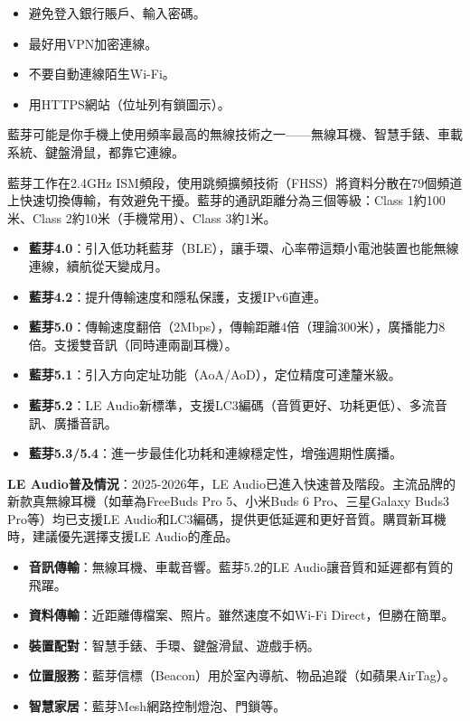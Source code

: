 \begin{itemize}
  \item 避免登入銀行賬戶、輸入密碼。
  \item 最好用VPN加密連線。
  \item 不要自動連線陌生Wi-Fi。
  \item 用HTTPS網站（位址列有鎖圖示）。
\end{itemize}


藍芽可能是你手機上使用頻率最高的無線技術之一——無線耳機、智慧手錶、車載系統、鍵盤滑鼠，都靠它連線。


藍芽工作在2.4GHz ISM頻段，使用跳頻擴頻技術（FHSS）將資料分散在79個頻道上快速切換傳輸，有效避免干擾。藍芽的通訊距離分為三個等級：Class 1約100米、Class 2約10米（手機常用）、Class 3約1米。


\begin{itemize}
  \item \textbf{藍芽4.0}：引入低功耗藍芽（BLE），讓手環、心率帶這類小電池裝置也能無線連線，續航從天變成月。
  \item \textbf{藍芽4.2}：提升傳輸速度和隱私保護，支援IPv6直連。
  \item \textbf{藍芽5.0}：傳輸速度翻倍（2Mbps），傳輸距離4倍（理論300米），廣播能力8倍。支援雙音訊（同時連兩副耳機）。
  \item \textbf{藍芽5.1}：引入方向定址功能（AoA/AoD），定位精度可達釐米級。
  \item \textbf{藍芽5.2}：LE Audio新標準，支援LC3編碼（音質更好、功耗更低）、多流音訊、廣播音訊。
  \item \textbf{藍芽5.3/5.4}：進一步最佳化功耗和連線穩定性，增強週期性廣播。
\end{itemize}

\textbf{LE Audio普及情況}：2025-2026年，LE Audio已進入快速普及階段。主流品牌的新款真無線耳機（如華為FreeBuds Pro 5、小米Buds 6 Pro、三星Galaxy Buds3 Pro等）均已支援LE Audio和LC3編碼，提供更低延遲和更好音質。購買新耳機時，建議優先選擇支援LE Audio的產品。


\begin{itemize}
  \item \textbf{音訊傳輸}：無線耳機、車載音響。藍芽5.2的LE Audio讓音質和延遲都有質的飛躍。
  \item \textbf{資料傳輸}：近距離傳檔案、照片。雖然速度不如Wi-Fi Direct，但勝在簡單。
  \item \textbf{裝置配對}：智慧手錶、手環、鍵盤滑鼠、遊戲手柄。
  \item \textbf{位置服務}：藍芽信標（Beacon）用於室內導航、物品追蹤（如蘋果AirTag）。
  \item \textbf{智慧家居}：藍芽Mesh網路控制燈泡、門鎖等。
\end{itemize}

